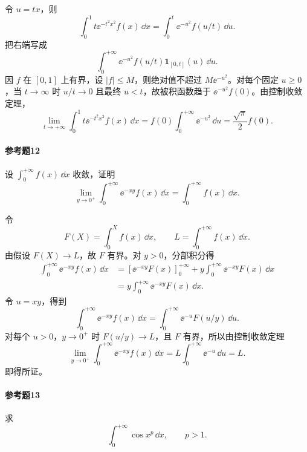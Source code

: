 \begin{xsolution}
令 $u=tx$，则
\[
\int_0^1t\ee^{-t^2x^2}f(x)\,\dd x
=\int_0^t\ee^{-u^2}f(u/t)\,\dd u.
\]
把右端写成
\[
\int_0^{+\infty}\ee^{-u^2}f(u/t)\mathbf{1}_{[0,t]}(u)\,\dd u.
\]
因 $f$ 在 $[0,1]$ 上有界，设 $|f|\leqslant M$，则绝对值不超过
$M\ee^{-u^2}$。对每个固定 $u\geqslant0$，当 $t\to\infty$ 时
$u/t\to0$ 且最终 $u<t$，故被积函数趋于 $\ee^{-u^2}f(0)$。由控制收敛定理，
\[
\boxed{
\lim_{t\to+\infty}
\int_0^1t\ee^{-t^2x^2}f(x)\,\dd x
=f(0)\int_0^{+\infty}\ee^{-u^2}\,\dd u
=\frac{\sqrt\pi}{2}f(0).}
\]
\end{xsolution}

\paragraph{参考题12}
设 $\int_0^{+\infty}f(x)\,\dd x$ 收敛，证明
\[
\lim_{y\to0^+}\int_0^{+\infty}\ee^{-xy}f(x)\,\dd x
=\int_0^{+\infty}f(x)\,\dd x.
\]

\begin{xsolution}
令
\[
F(X)=\int_0^X f(x)\,\dd x,
\qquad
L=\int_0^{+\infty}f(x)\,\dd x.
\]
由假设 $F(X)\to L$，故 $F$ 有界。对 $y>0$，分部积分得
\[
\begin{aligned}
\int_0^{+\infty}\ee^{-xy}f(x)\,\dd x
&=[\ee^{-xy}F(x)]_0^{+\infty}
+y\int_0^{+\infty}\ee^{-xy}F(x)\,\dd x\\
&=y\int_0^{+\infty}\ee^{-xy}F(x)\,\dd x.
\end{aligned}
\]
令 $u=xy$，得到
\[
\int_0^{+\infty}\ee^{-xy}f(x)\,\dd x
=\int_0^{+\infty}\ee^{-u}F(u/y)\,\dd u.
\]
对每个 $u>0$，$y\to0^+$ 时 $F(u/y)\to L$，且 $F$ 有界，所以由控制收敛定理
\[
\lim_{y\to0^+}\int_0^{+\infty}\ee^{-xy}f(x)\,\dd x
=L\int_0^{+\infty}\ee^{-u}\,\dd u=L.
\]
即得所证。
\end{xsolution}

\paragraph{参考题13}
求
\[
\int_0^{+\infty}\cos x^p\,\dd x,
\qquad p>1.
\]

